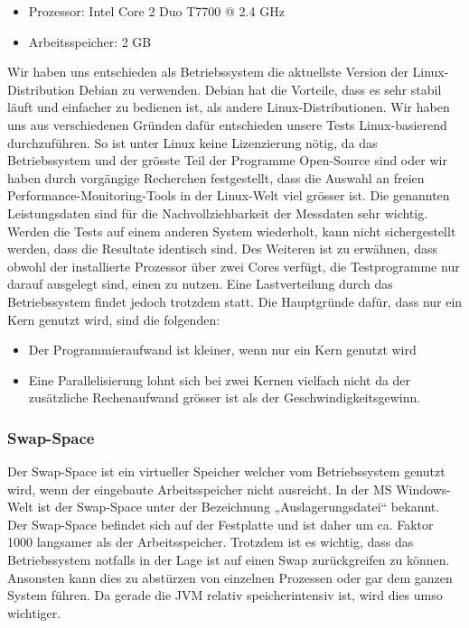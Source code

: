 \documentclass{fancydocument}
\begin{document}
\begin{itemize}
\item Prozessor: Intel Core 2 Duo T7700 @ 2.4 GHz
\item Arbeitsspeicher: 2 GB
\end{itemize}

Wir haben uns entschieden als Betriebssystem die aktuellste Version der Linux-Distribution Debian zu verwenden. Debian hat die Vorteile, dass es sehr stabil läuft und einfacher zu bedienen ist, als andere Linux-Distributionen. Wir haben uns aus verschiedenen Gründen dafür entschieden unsere Tests Linux-basierend durchzuführen. So ist unter Linux keine Lizenzierung nötig, da das Betriebssystem und der grösste Teil der Programme Open-Source sind  oder  wir haben durch vorgängige Recherchen festgestellt, dass die Auswahl an freien Performance-Monitoring-Tools in der Linux-Welt viel grösser ist.
Die genannten Leistungsdaten sind für die Nachvollziehbarkeit der Messdaten sehr wichtig. Werden die Tests auf einem anderen System wiederholt, kann nicht sichergestellt werden, dass die Resultate identisch sind. 
Des Weiteren ist zu erwähnen, dass obwohl der installierte Prozessor über zwei Cores verfügt, die Testprogramme nur darauf ausgelegt sind, einen zu nutzen. Eine Lastverteilung durch das Betriebssystem findet jedoch trotzdem statt. Die Hauptgründe dafür, dass nur ein Kern genutzt wird, sind die folgenden:

\begin{itemize}
\item Der Programmieraufwand ist kleiner, wenn nur ein Kern genutzt wird
\item Eine Parallelisierung lohnt sich bei zwei Kernen vielfach nicht da der zusätzliche Rechenaufwand grösser ist als der Geschwindigkeitsgewinn.
\end{itemize}

\subsubsection{Swap-Space}
Der Swap-Space ist ein virtueller Speicher welcher vom Betriebssystem genutzt wird, wenn der eingebaute Arbeitsspeicher nicht ausreicht. In der MS Windows-Welt ist der Swap-Space unter der Bezeichnung „Auslagerungsdatei“ bekannt. Der Swap-Space befindet sich auf der Festplatte und ist daher um ca. Faktor 1000 langsamer als der Arbeitsspeicher. Trotzdem ist es wichtig, dass das Betriebssystem notfalls in der Lage ist auf einen Swap zurückgreifen zu können. Ansonsten kann dies zu abstürzen von einzelnen Prozessen oder gar dem ganzen System führen. Da gerade die JVM relativ speicherintensiv ist, wird dies umso wichtiger.
\end{document}
